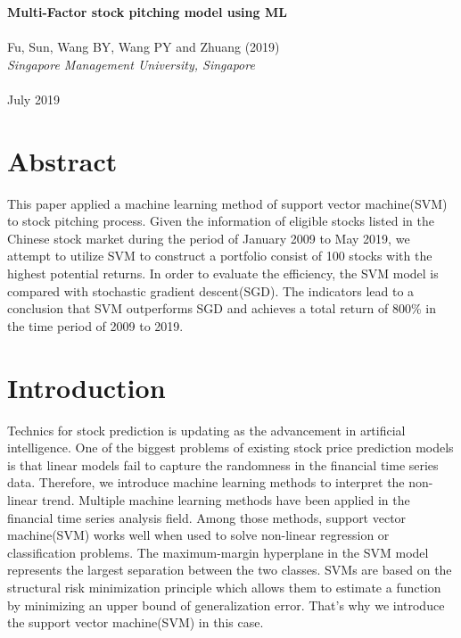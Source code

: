 \documentclass[12pt]{article}
\begin{document}
	\thispagestyle{plain}
	\noindent \Large \textbf{Multi-Factor stock pitching model using ML}\\ \\
	\noindent Fu, Sun, Wang BY, Wang PY and Zhuang (2019)\\
	\noindent \normalsize \textit{Singapore Management University, Singapore}\\ \\
	\noindent July 2019
	
\section{Abstract} %
This paper applied a machine learning method of support vector machine(SVM) to stock pitching process. Given the information of eligible stocks listed in the Chinese stock market during the period of January 2009 to May 2019, we attempt to utilize SVM to construct a portfolio consist of 100 stocks with the highest potential returns. In order to evaluate the efficiency, the SVM model is compared with stochastic gradient descent(SGD). The indicators lead to a conclusion that SVM outperforms SGD and achieves a total return of 800\% in the time period of 2009 to 2019.

	
\section{Introduction} %
Technics for stock prediction is updating as the advancement in artificial intelligence.  One of the biggest problems of existing stock price prediction models is that linear models fail to capture the randomness in the financial time series data. Therefore, we introduce machine learning methods to interpret the non-linear trend. Multiple machine learning methods have been applied in the financial time series analysis field. Among those methods, support vector machine(SVM) works well when used to solve non-linear regression or classification problems. The maximum-margin hyperplane in the SVM model represents the largest separation between the two classes. SVMs are based on the structural risk minimization principle which allows them to estimate a function by minimizing an upper bound of generalization error.\cite{Vapnik} That's why we introduce the support vector machine(SVM) in this case.\\
\end{document}
